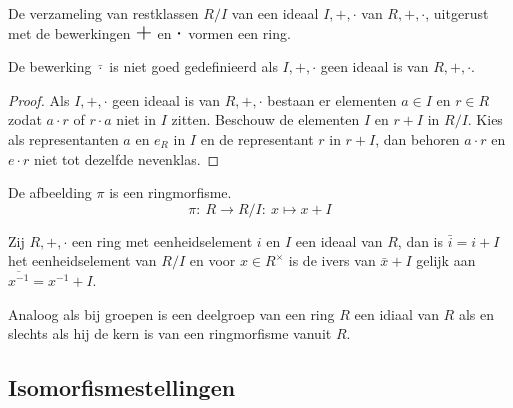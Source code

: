 \documentclass[main.tex]{subfiles}
\begin{document}
\begin{st}
  De verzameling van restklassen $R/I$ van een ideaal $I,+,\cdot$ van $R,+,\cdot$, uitgerust met de bewerkingen $\scalebox{1.5}{$+$}$ en $\scalebox{1.5}{$\cdot$}$ vormen een ring.
\end{st}

\begin{opm}
  De bewerking $\bar{\cdot}$ is niet goed gedefinieerd als $I,+,\cdot$ geen ideaal is van $R,+,\cdot$.

  \begin{proof}
    Als $I,+,\cdot$ geen ideaal is van $R,+,\cdot$ bestaan er elementen $a\in I$ en $r\in R$ zodat $a\cdot r$ of $r\cdot a$ niet in $I$ zitten.
    Beschouw de elementen $I$ en $r+I$ in $R/I$.
    Kies als representanten $a$ en $e_{R}$ in $I$ en de representant $r$ in $r+I$, dan behoren $a\cdot r$ en $e\cdot r$ niet tot dezelfde nevenklas.
  \end{proof}
\end{opm}

\begin{pr}
  De afbeelding $\pi$ is een ringmorfisme.
  \[ \pi:\ R \rightarrow R/I:\ x \mapsto x+I \]
\end{pr}

\begin{st}
  Zij $R,+,\cdot$ een ring met eenheidselement $i$ en $I$ een ideaal van $R$, dan is $\bar{i} = i + I$ het eenheidselement van $R/I$ en voor $x\in R^{\times}$ is de ivers van $\bar{x} + I$ gelijk aan $\overline{x^{-1}} = x^{-1} + I$. 
\end{st}

\begin{opm}
  Analoog als bij groepen is een deelgroep van een ring $R$ een idiaal van $R$ als en slechts als hij de kern is van een ringmorfisme vanuit $R$.
\end{opm}

\subsection{Isomorfismestellingen}
\label{sec:isomorfismestellingen}
\end{document}
